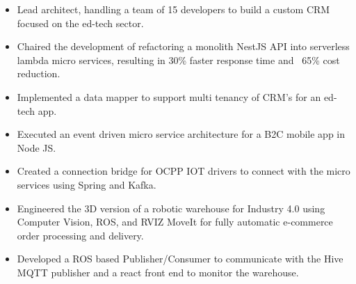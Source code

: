 \documentclass[10pt,a4paper,ragged2e]{classes/altacv}
\begin{document}
\tagline{ }

\begin{fullwidth}
\makecvheader
\end{fullwidth}




\begin{itemize}
\item Lead architect, handling a team of 15 developers to build a custom CRM focused on the ed-tech sector.
\item Chaired the development of refactoring a monolith NestJS API into serverless lambda micro services, resulting in 30\% faster response time and ~65\% cost reduction.
\item Implemented a data mapper to support multi tenancy of CRM's for an ed-tech app.
\end{itemize}

\divider

\begin{itemize}
\item Executed an event driven micro service architecture for a B2C mobile app in Node JS.
\item Created a connection bridge for OCPP IOT drivers to connect with the micro services using Spring and Kafka.
\end{itemize}

\divider

\begin{itemize}
\item Engineered the 3D version of a robotic warehouse for Industry 4.0 using Computer Vision, ROS, and RVIZ
MoveIt for fully automatic e-commerce order processing and delivery.
\smallskip
\item Developed a ROS based Publisher/Consumer to communicate with the Hive MQTT publisher and a react front end to monitor the warehouse.
\end{itemize}
\end{document}
